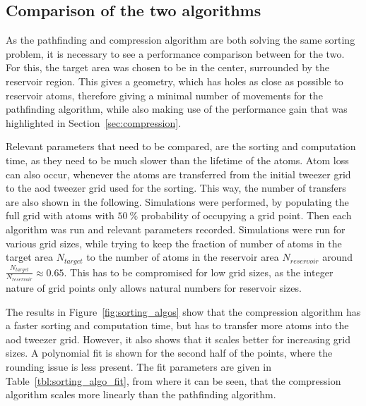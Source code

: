 \subsection{Comparison of the two algorithms}

As the pathfinding and compression algorithm are both solving the same sorting problem, it is necessary to see a performance comparison between for the two. For this, the target area was chosen to be in the center, surrounded by the reservoir region. This gives a geometry, which has holes as close as possible to reservoir atoms, therefore giving a minimal number of movements for the pathfinding algorithm, while also making use of the performance gain that was highlighted in Section~\ref{sec:compression}.

Relevant parameters that need to be compared, are the sorting and computation time, as they need to be much slower than the lifetime of the atoms. Atom loss can also occur, whenever the atoms are transferred from the initial tweezer grid to the \ac{aod} tweezer grid used for the sorting. This way, the number of transfers are also shown in the following.
Simulations were performed, by populating the full grid with atoms with $\SI{50}{\percent}$ probability of occupying a grid point. Then each algorithm was run and relevant parameters recorded. Simulations were run for various grid sizes, while trying to keep the fraction of number of atoms in the target area $N_{target}$ to the number of atoms in the reservoir area $N_{reservoir}$ around $\frac{N_{target}}{N_{reservoir}} \approx 0.65$. This has to be compromised for low grid sizes, as the integer nature of grid points only allows natural numbers for reservoir sizes.

The results in Figure~\ref{fig:sorting_algos} show that the compression algorithm has a faster sorting and computation time, but has to transfer more atoms into the \ac{aod} tweezer grid. However, it also shows that it scales better for increasing grid sizes. A polynomial fit is shown for the second half of the points, where the rounding issue is less present. The fit parameters are given in Table~\ref{tbl:sorting_algo_fit}, from where it can be seen, that the compression algorithm scales more linearly than the pathfinding algorithm.

